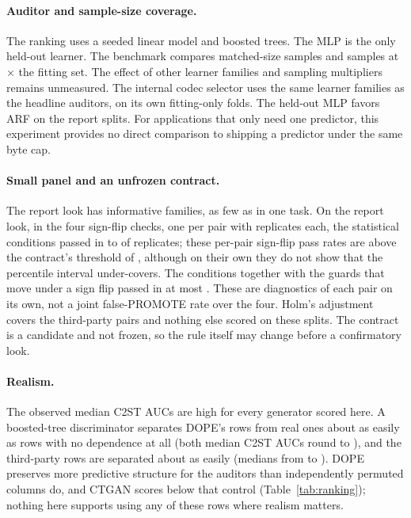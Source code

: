 \paragraph{Auditor and sample-size coverage.}
The ranking uses a seeded linear model and boosted trees. The MLP is the only held-out learner. The benchmark compares matched-size samples and samples at $\times$ the fitting set. The effect of other learner families and sampling multipliers remains unmeasured.
The internal codec selector uses the same learner families as the headline auditors, on its own fitting-only folds. The held-out MLP favors ARF on the report splits. For applications that only need one predictor, this experiment provides no direct comparison to shipping a predictor under the same byte cap.

\paragraph{Small panel and an unfrozen contract.}
The report look has  informative families, as few as  in one task.
On the report look, in the four sign-flip checks, one per pair with  replicates each, the statistical conditions passed in  to  of replicates; these per-pair sign-flip pass rates are above the contract's threshold of , although on their own they do not show that the percentile interval under-covers. The conditions together with the guards that move under a sign flip passed in at most .
These are diagnostics of each pair on its own, not a joint false-PROMOTE rate over the four.
Holm's adjustment covers the  third-party pairs and nothing else scored on these splits.
The contract is a candidate and not frozen, so the rule itself may change before a confirmatory look.

\paragraph{Realism.}
The observed median C2ST AUCs are high for every generator scored here.
A boosted-tree discriminator separates DOPE's rows from real ones about as easily as rows with no dependence at all (both median C2ST AUCs round to ), and the third-party rows are separated about as easily (medians from  to ).
DOPE preserves more predictive structure for the auditors than independently permuted columns do, and CTGAN scores below that control (Table~\ref{tab:ranking}); nothing here supports using any of these rows where realism matters.

